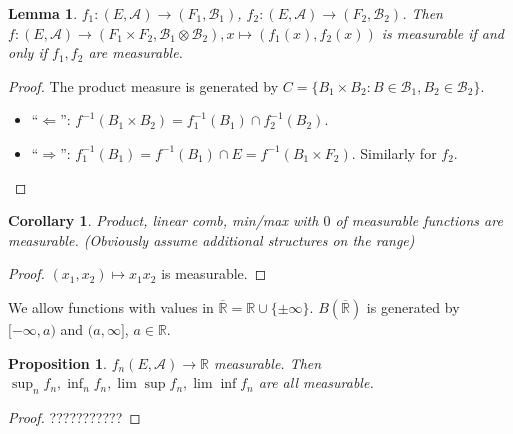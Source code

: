 \documentclass{article}
\theoremstyle{definition}
\theoremstyle{remark}
\theoremstyle{plain}
\newtheorem{prop}[defn]{Proposition}
\newtheorem{crly}[defn]{Corollary}
\newtheorem{lem}[defn]{Lemma}
\newcommand{\RR}{\mathbb{R}}
\begin{document}
\begin{lem}
    $f_1:(E,\mathcal{A})\to(F_1,\mathcal{B}_1)$, $f_2:(E,\mathcal{A})\to(F_2,\mathcal{B}_2)$. Then $f:(E,\mathcal{A})\to(F_1\times F_2,\mathcal{B}_1\otimes\mathcal{B}_2), x\mapsto (f_1(x),f_2(x))$ is measurable if and only if $f_1,f_2$ are measurable.
\end{lem}
\begin{proof}
    The product measure is generated by $C=\{B_1\times B_2:B\in \mathcal{B}_1, B_2\in\mathcal{B}_2\}$. 
    \begin{itemize}
        \item ``$\Leftarrow$'': $f^{-1}(B_1\times B_2)=f_1^{-1}(B_1)\cap f_2^{-1}(B_2)$.
        \item ``$\Rightarrow$'':  $f_1^{-1}(B_1)=f^{-1}(B_1)\cap E=f^{-1}(B_1\times F_2)$. Similarly for $f_2$.
    \end{itemize}
\end{proof}
\begin{crly}
    Product, linear comb, min/max with $0$ of measurable functions are measurable. (Obviously assume additional structures on the range)
\end{crly}
\begin{proof}
    $(x_1,x_2)\mapsto x_1x_2$ is measurable.
\end{proof}

We allow functions with values in $\overline{\RR}=\RR\cup\{\pm\infty\}$. $B(\overline{\RR})$ is generated by $[-\infty,a)$ and $(a,\infty]$, $a\in\RR$.

\begin{prop}
    $f_n(E,\mathcal{A})\to\RR$ measurable. Then $\sup_nf_n,\inf_nf_n,\lim\sup f_n,\lim\inf f_n$ are all measurable.
\end{prop}
\begin{proof}
    ???????????
\end{proof}
\end{document}
